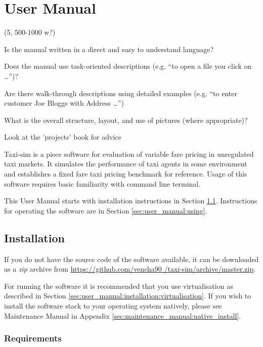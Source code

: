 \newpage
\section{User Manual}
\label{sec:user_manual}

(5, 500-1000 w?)

Is the manual written in a direct and easy to understand language?

Does the manual use task-oriented descriptions (e.g. “to open a file you click
on …”)?

Are there walk-through descriptions using detailed examples (e.g. “to enter
customer Joe Bloggs with Address …”)

What is the overall structure, layout, and use of pictures (where appropriate)?

Look at the 'projects' book for advice


Taxi-sim is a piece software for evaluation of variable fare pricing in
unregulated taxi markets. It simulates the performance of taxi agents in some
environment and establishes a fixed fare taxi pricing benchmark for reference.
Usage of this software requires basic familiarity with command line terminal.

This User Manual starts with installation instructions in Section
\ref{sec:user_manual:installation}. Instructions for operating the software are
in Section \ref{sec:user_manual:using}.


\subsection{Installation}
\label{sec:user_manual:installation}

If you do not have the source code of the software available, it can be
downloaded as a \textit{zip} archive from \url{https://github.com/vencha90
/taxi-sim/archive/master.zip}.

For running the software it is recommended that you use virtualisation as
described in Section \ref{sec:user_manual:installation:virtualisation}. If you
wish to install the software stack to your operating system natively, please
see Maintenance Manual in Appendix \ref{sec:maintenance_manual:native_install}.


\subsubsection{Requirements}

